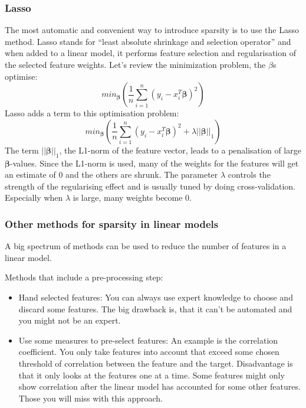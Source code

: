 \documentclass[12pt,]{krantz}
\providecommand{\tightlist}{%
  \setlength{\itemsep}{0pt}\setlength{\parskip}{0pt}}
\theoremstyle{definition}
\theoremstyle{definition}
\theoremstyle{definition}
\theoremstyle{remark}
\begin{document}
\subsubsection{Lasso}\label{lasso}

The most automatic and convenient way to introduce sparsity is to use
the Lasso method. Lasso stands for ``least absolute shrinkage and
selection operator'' and when added to a linear model, it performs
feature selection and regularisation of the selected feature weights.
Let's review the minimization problem, the \(\beta\)s optimise:
\[ min_{\mathbf{\beta}} \left( \frac{1}{n} \sum_{i=1}^n (y_i - x_i^T \mathbf{\beta})^2\right)\]
Lasso adds a term to this optimisation problem:
\[ min_{\mathbf{\beta}} \left( \frac{1}{n} \sum_{i=1}^n (y_i - x_i^T \mathbf{\beta})^2 + \lambda ||\mathbf{\beta}||_1\right)\]
The term \(||\mathbf{\beta}||_1\), the L1-norm of the feature vector,
leads to a penalisation of large \(\mathbf{\beta}\)-values. Since the
L1-norm is used, many of the weights for the features will get an
estimate of 0 and the others are shrunk. The parameter \(\lambda\)
controls the strength of the regularising effect and is usually tuned by
doing cross-validation. Especially when \(\lambda\) is large, many
weights become 0.

\subsubsection{Other methods for sparsity in linear
models}\label{other-methods-for-sparsity-in-linear-models}

A big spectrum of methods can be used to reduce the number of features
in a linear model.

Methods that include a pre-processing step:

\begin{itemize}
\tightlist
\item
  Hand selected features: You can always use expert knowledge to choose
  and discard some features. The big drawback is, that it can't be
  automated and you might not be an expert.
\item
  Use some measures to pre-select features: An example is the
  correlation coefficient. You only take features into account that
  exceed some chosen threshold of correlation between the feature and
  the target. Disadvantage is that it only looks at the features one at
  a time. Some features might only show correlation after the linear
  model has accounted for some other features. Those you will miss with
  this approach.
\end{itemize}
\end{document}
